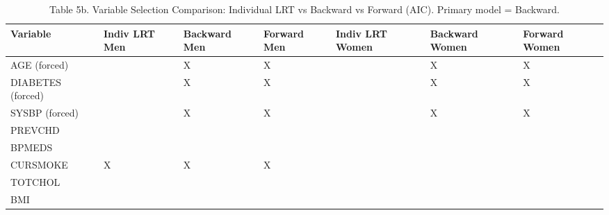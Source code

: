 \begin{table}[ht]
\centering
\caption{Table 5b. Variable Selection Comparison: Individual LRT vs Backward vs Forward (AIC). Primary model = Backward.} 
\begin{tabular}{lllllll}
  \toprule
Variable & Indiv LRT Men & Backward Men & Forward Men & Indiv LRT Women & Backward Women & Forward Women \\ 
  \midrule
AGE (forced) &  & X & X &  & X & X \\ 
  DIABETES (forced) &  & X & X &  & X & X \\ 
  SYSBP (forced) &  & X & X &  & X & X \\ 
  PREVCHD &  &  &  &  &  &  \\ 
  BPMEDS &  &  &  &  &  &  \\ 
  CURSMOKE & X & X & X &  &  &  \\ 
  TOTCHOL &  &  &  &  &  &  \\ 
  BMI &  &  &  &  &  &  \\ 
   \bottomrule
\end{tabular}
\end{table}
